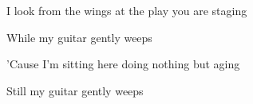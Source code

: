 \begin{song}
\bigskip

I look from the wings at the play you are staging \par
{} While my guitar gently weeps  \par
'Cause I'm sitting here doing nothing but aging \par
{} Still my guitar gently weeps  \par

\bigskip

\Outro \par
{}    \par
{}    \par
{}    \par


\end{song}

